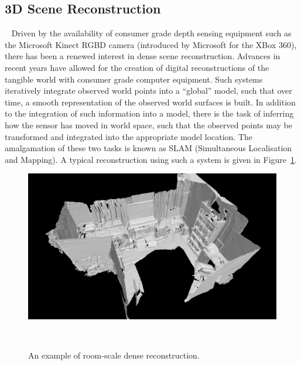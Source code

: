 \subsection{3D Scene Reconstruction}
~\label{subsec:intro_scene_recon}
Driven by the availability of consumer grade depth sensing equipment such as the Microsoft Kinect RGBD camera 
(introduced by Microsoft for the XBox 360), there has been a renewed interest in dense scene reconstruction. 
Advances in recent years have allowed for the creation of digital reconstructions of the tangible world with 
consumer grade computer equipment. Such systems iteratively integrate observed world points into a ``global'' 
model, such that over time, a smooth representation of the observed world surfaces is built. In addition to the 
integration of such information into a model, there is the task of inferring how the sensor has moved in world 
space, such that the observed points may be transformed and integrated into the appropriate model location. The 
amalgamation of these two tasks is known as SLAM (Simultaneous Localisation and Mapping). A typical reconstruction 
using such a system is given in Figure~\ref{figure:room_recon_example}.
\begin{figure}[!htbp]
  \centering
  \includegraphics[width=.9\linewidth]{figures/intro/room_scene.png}
  \caption[Room Scale Dense Reconstruction]{An example of room-scale dense reconstruction.}
~\label{figure:room_recon_example}
\end{figure}



